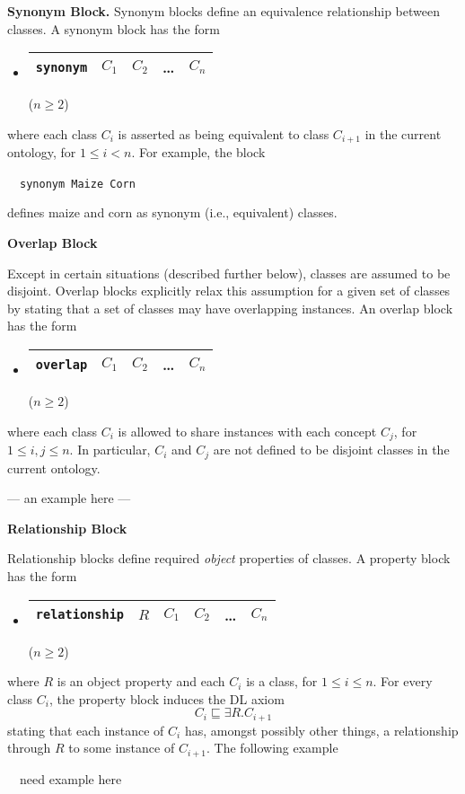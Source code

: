 \documentclass[preprint,number]{elsarticle}
\newcommand{\mypara}[1]{\vspace{12pt}\noindent\textbf{#1}}
\begin{document}
\mypara{Synonym Block.} Synonym blocks define an equivalence
relationship between classes.  A synonym block has the form
\begin{itemize}
\item[] 
  \begin{tabular}{|l|l|l|l|l|}\hline
    \texttt{synonym} & $C_1$ & $C_2$ & \dots & $C_n$ \\ \hline 
  \end{tabular} \hfill ($n \ge 2$)
\end{itemize}
where each class $C_i$ is asserted as being equivalent to class
$C_{i+1}$ in the current ontology, for $1 \le i < n$. For example, the
block
\begin{tabbing}
~~\texttt{synonym Maize Corn}
\end{tabbing}
defines maize and corn as synonym (i.e., equivalent) classes.


\mypara{Overlap Block} 

\mypara{}Except in certain situations (described further below),
classes are assumed to be disjoint.  Overlap blocks explicitly relax
this assumption for a given set of classes by stating that a set of
classes may have overlapping instances. An overlap block has the form
\begin{itemize}
\item[] 
  \begin{tabular}{|l|l|l|l|l|}\hline
    \texttt{overlap} & $C_1$ & $C_2$ & \dots & $C_n$ \\ \hline 
  \end{tabular} \hfill ($n \ge 2$)
\end{itemize}
where each class $C_i$ is allowed to share instances with each concept
$C_j$, for $1 \le i,j \le n$. In particular, $C_i$ and $C_j$ are not
defined to be disjoint classes in the current ontology. 

--- an example here ---


\mypara{Relationship Block}

\mypara{}Relationship blocks define required \emph{object} properties
of classes. A property block has the form
\begin{itemize}
\item[]
  \begin{tabular}{|l|l|l|l|l|l|}\hline \texttt{relationship} & $R$ & $C_1$
    & $C_2$ & \dots & $C_n$ \\ \hline
  \end{tabular} \hfill ($n \ge 2$)
\end{itemize}
where $R$ is an object property and each $C_i$ is a class, for $1 \le
i \le n$.  For every class $C_i$, the property block induces the DL
axiom \[C_i \sqsubseteq \exists R . C_{i+1} \] stating that each
instance of $C_i$ has, amongst possibly other things, a relationship
through $R$ to some instance of $C_{i+1}$.  The following example
\begin{tabbing}
   ~~need example here
\end{tabbing}
\end{document}

